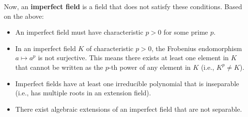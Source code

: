 Now, an \textbf{imperfect field} is a field that does not satisfy these conditions. Based on the above:

\begin{itemize}
	\item An imperfect field must have characteristic $p>0$ for some prime $p$.
	\item In an imperfect field $K$ of characteristic $p>0$, the Frobenius endomorphism $a \mapsto a^p$ is not surjective. This means there exists at least one element in $K$ that cannot be written as the $p$-th power of any element in $K$ (i.e., $K^p \neq K$).
	\item Imperfect fields have at least one irreducible polynomial that is inseparable (i.e., has multiple roots in an extension field).
	\item There exist algebraic extensions of an imperfect field that are not separable.
\end{itemize}
